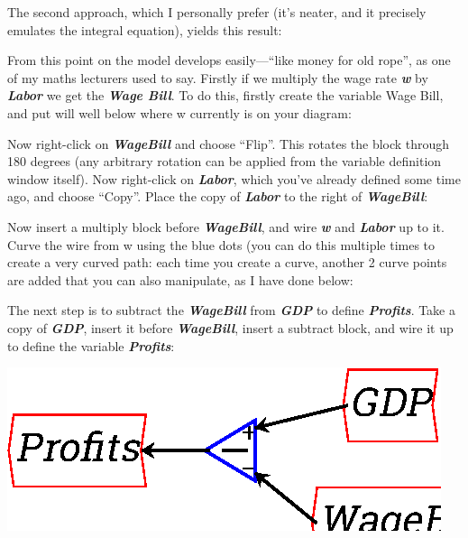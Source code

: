 
The second approach, which I personally prefer (it's neater, and it
precisely emulates the integral equation), yields this result: 


From this point on the model develops easily---``like money for old
rope'', as one of my maths lecturers used to say. Firstly if we
multiply the wage rate {\bf\em w} by {\bf\em Labor} we get the {\em\bf
Wage Bill}. To do this,
firstly create the variable Wage Bill, and put will well below where w
currently is on your diagram: 


Now right-click on {\bf\em WageBill} and choose ``Flip''. This rotates
the block through 180 degrees (any arbitrary rotation can be applied
from the variable definition window itself). Now right-click on
{\bf\em Labor}, which you've already defined some time ago, and choose
``Copy''. Place the copy of {\bf\em Labor} to the right of {\bf\em
WageBill}:

\begin{center}
\end{center}

Now insert a multiply block before {\bf\em WageBill}, and wire {\bf\em
w} and {\bf\em Labor} up to it. Curve the wire from w using the blue
dots (you can do this multiple times to create a very curved path:
each time you create a curve, another 2 curve points are added that
you can also manipulate, as I have done below: 



The next step is to subtract the {\bf\em WageBill} from {\bf\em GDP}
to define {\bf\em Profits}. Take a copy of {\bf\em GDP}, insert it
before {\bf\em WageBill}, insert a subtract block, and wire it up to
define the variable {\bf\em Profits}:

\begin{center}
\includegraphics{images/NewItem100.eps}
\end{center}


